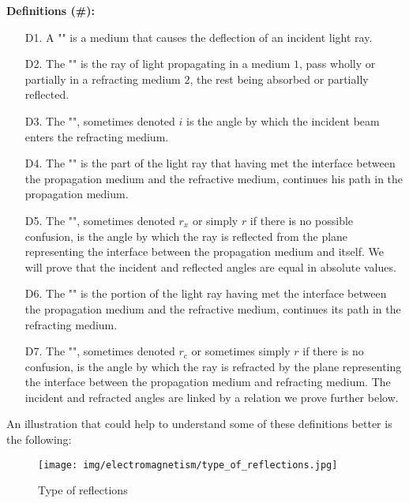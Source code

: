	\pagebreak
	\textbf{Definitions (\#\mydef):} 
	\begin{enumerate}
		\item[D1.] A "" is a medium that causes the deflection of an incident light ray.
		
		\item[D2.] The "" is the ray of light propagating in a medium $1$, pass wholly or partially in a refracting medium $2$, the rest being absorbed or partially reflected.
		
		\item[D3.] The "", sometimes denoted $i$ is the angle by which the incident beam enters the refracting medium.
		
		\item[D4.] The "" is the part of the light ray that having met the interface between the propagation medium and the refractive medium, continues his path in the propagation medium.
		
		\item[D5.] The "", sometimes denoted $r_x$ or simply $r$ if there is no possible confusion, is the angle by which the ray is reflected from the plane representing the interface between the propagation medium and itself. We will prove that the incident and reflected angles are equal in absolute values.
		
		\item[D6.] The "" is the portion of the light ray having met the interface between the propagation medium and the refractive medium, continues its path in the refracting medium.
		
		\item[D7.] The "", sometimes denoted $r_c$ or sometimes simply $r$ if there is no confusion, is the angle by which the ray is refracted by the plane representing the interface between the propagation medium and refracting medium. The incident and refracted angles are linked by a relation we prove further below.
	\end{enumerate}
	An illustration that could help to understand some of these definitions better is the following:
	\begin{figure}[H]
		\centering
		\texttt{[image: img/electromagnetism/type\_of\_reflections.jpg]}
		\caption{Type of reflections}
	\end{figure}
